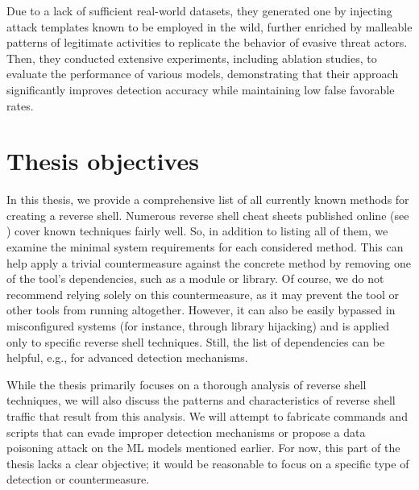 Due to a lack of sufficient real-world datasets, they generated one by injecting attack templates known to be employed in the wild, further enriched by malleable patterns of legitimate activities to replicate the behavior of evasive threat actors. Then, they conducted extensive experiments, including ablation studies, to evaluate the performance of various models, demonstrating that their approach significantly improves detection accuracy while maintaining low false favorable rates.



\section{Thesis objectives}

In this thesis, we provide a comprehensive list of all currently known methods for creating a reverse shell. Numerous reverse shell cheat sheets published online (see \cite{cheatsheet1, cheatsheet2, cheatsheet3}) cover known techniques fairly well. So, in addition to listing all of them, we examine the minimal system requirements for each considered method. This can help apply a trivial countermeasure against the concrete method by removing one of the tool's dependencies, such as a module or library. Of course, we do not recommend relying solely on this countermeasure, as it may prevent the tool or other tools from running altogether. However, it can also be easily bypassed in misconfigured systems (for instance, through library hijacking) and is applied only to specific reverse shell techniques. Still, the list of dependencies can be helpful, e.g., for advanced detection mechanisms.

While the thesis primarily focuses on a thorough analysis of reverse shell techniques, we will also discuss the patterns and characteristics of reverse shell traffic that result from this analysis. We will attempt to fabricate commands and scripts that can evade improper detection mechanisms or propose a data poisoning attack on the ML models mentioned earlier. For now, this part of the thesis lacks a clear objective; it would be reasonable to focus on a specific type of detection or countermeasure.

